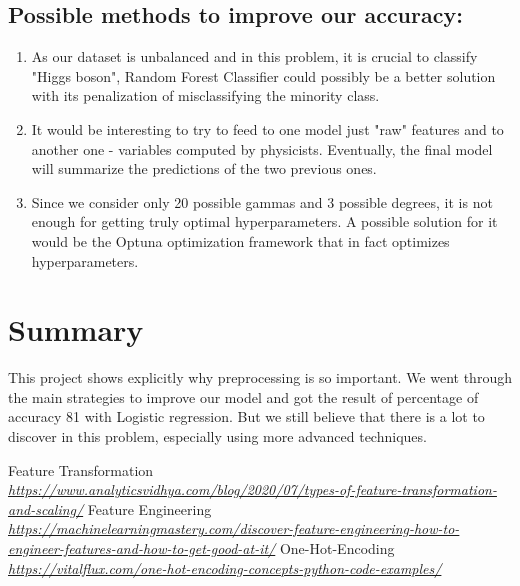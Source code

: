 \documentclass[10pt,conference,compsocconf]{IEEEtran}
\begin{document}
\subsection{Possible methods to improve our accuracy:}
\begin{enumerate}
    \item {As our dataset is unbalanced and in this problem, it is crucial to classify "Higgs boson", Random Forest Classifier could possibly be a better solution with its penalization of misclassifying the minority class.}
    \item {It would be interesting to try to feed to one model just "raw" features and to another one  - variables computed by physicists. Eventually, the final model will summarize the predictions of the two previous ones.}
    \item {Since we consider only 20 possible gammas and 3 possible degrees, it is not enough for getting truly optimal hyperparameters. A possible solution for it would be the Optuna optimization framework that in fact optimizes hyperparameters.}
\end{enumerate}
\section{Summary}
This project shows explicitly why preprocessing is so important. We went through the main strategies to improve our model and got the result of percentage of accuracy 81 with Logistic regression. But we still believe that there is a lot to discover in this problem, especially using more advanced techniques. 

\begin{thebibliography}{9}
  Feature Transformation\\
  \textit{\url{https://www.analyticsvidhya.com/blog/2020/07/types-of-feature-transformation-and-scaling/}}
  Feature Engineering\\ \textit{\url{https://machinelearningmastery.com/discover-feature-engineering-how-to-engineer-features-and-how-to-get-good-at-it/}}
  One-Hot-Encoding\\
  \textit{\url{https://vitalflux.com/one-hot-encoding-concepts-python-code-examples/}}
\end{thebibliography}
\end{document}
